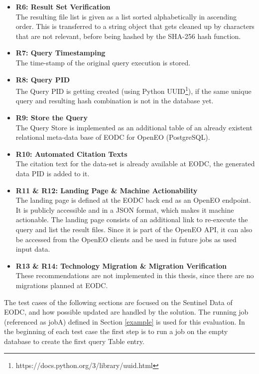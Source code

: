 \documentclass[draft,final]{vutinfth} %
\begin{document}
\begin{itemize}
	\item \textbf{R6: Result Set Verification} \\
	The resulting file list is given as a list sorted alphabetically in ascending order. This is transferred to a string object that gets cleaned up by characters that are not relevant, before being hashed by the SHA-256 hash function. 
	\item \textbf{R7: Query Timestamping} \\
	The time-stamp of the original query execution is stored. 
	\item \textbf{R8: Query PID}\\
	The Query PID is getting created (using Python UUID\footnote{https://docs.python.org/3/library/uuid.html}), if the same unique query and resulting hash combination is not in the database yet.
	\item \textbf{R9: Store the Query} \\
	The Query Store is implemented as an additional table of an already existent relational meta-data base of EODC for OpenEO (PostgreSQL). 
	\item \textbf{R10: Automated Citation Texts} \\
	The citation text for the data-set is already available at EODC, the generated data PID is added to it. 
	\item \textbf{R11 \& R12: Landing Page \& Machine Actionability} \\
	The landing page is defined at the EODC back end as an OpenEO endpoint. It is publicly accessible and in a JSON format, which makes it machine actionable. The landing page consists of an additional link to re-execute the query and list the result files. Since it is part of the OpenEO API, it can also be accessed from the OpenEO clients and be used in future jobs as used input data.
	\item \textbf{R13 \& R14: Technology Migration \& Migration Verification} \\
	These recommendations are not implemented in this thesis, since there are no migrations planned at EODC.
\end{itemize}

The test cases of the following sections are focused on the Sentinel Data of EODC, and how possible updated are handled by the solution. The running job (referenced as jobA) defined in Section \ref{example} is used for this evaluation. In the beginning of each test case the first step is to run a job on the empty database to create the first query Table entry. 
\end{document}
